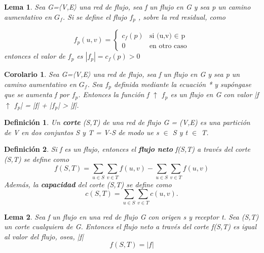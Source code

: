 \documentclass[10pt]{article} %
\newtheorem{mydef}{Definici\'on}%
\newtheorem{lem}{Lema}
\newtheorem{col}{Corolario}
\begin{document}
	\begin{lem}
		Sea G=〈V,E〉 una red de flujo, sea f un flujo en G y sea p un camino aumentativo en $G_f$. Si se define el flujo $f_p$ , sobre la red residual, como
		
		\begin{equation}
			f_p(u,v) = \left\{
			\begin{array}{lr}
				c_f(p) & \text{si (u,v) $\in$ p}\\
				0 & \text{en otro caso}
			\end{array}
			\right.
		\end{equation}
		entonces el valor de $f_p$ es $|f_p|=c_f(p)>0$	
		
	\end{lem}

	\begin{col}
		Sea G=〈V,E〉 una red de flujo, sea f un flujo en G y sea p un camino aumentativo en $G_f$. Sea $f_p$ definida mediante la ecuación * y supóngase que se aumenta f por $f_p$. Entonces la función f $\uparrow$ $f_p$ es un flujo en G con valor |f $\uparrow$ $f_p$| = |f| + |$f_p$| > |f|.
	\end{col}

	\begin{mydef}
		Un \textbf{corte} (S,T) de una red de flujo G = (V,E) es una partici\'on de V en dos conjuntos S y T = V-S de modo 	ue s $\in$ S y t $\in$ T.
	\end{mydef}

	\begin{mydef}
		Si f es un flujo, entonces el \textbf{flujo neto} f(S,T) a trav\'es del corte (S,T) se define como
		\begin{equation}
			f(S,T) = \sum_{u\in S} \sum_{v\in T} f(u,v) - \sum_{u \in S}\sum_{v \in T} f(u,v)
		\end{equation}
	Adem\'as, la \textbf{capacidad} del corte (S,T) se define como
	\begin{equation}
		c(S,T) = \sum_{u \in S}\sum_{v \in T}c(u,v).
	\end{equation} 
	\end{mydef}

	\begin{lem}
		Sea f un flujo en una red de flujo G con origen s y receptor t. Sea (S,T) un corte cualquiera de G. Entonces el flujo neto a través del corte f(S,T) es igual al valor del flujo, osea, |f|
		\begin{equation}
			f(S,T) = |f|
		\end{equation}
	\end{lem}
\end{document}
